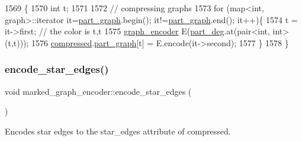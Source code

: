 \begin{DoxyCode}
1569 \{
1570   \textcolor{keywordtype}{int} t;
1571 
1572   \textcolor{comment}{// compressing graphs}
1573   \textcolor{keywordflow}{for} (map<int, graph>::iterator it=\hyperlink{classmarked__graph__encoder_adbafd0769ae301acc1b2c19b5e1d4844}{part\_graph}.begin(); it!=\hyperlink{classmarked__graph__encoder_adbafd0769ae301acc1b2c19b5e1d4844}{part\_graph}.end(); it++)\{
1574     t = it->first; \textcolor{comment}{// the color is t,t}
1575     \hyperlink{classgraph__encoder}{graph\_encoder} E(\hyperlink{classmarked__graph__encoder_a55ea2edb2609dfc287432f61900d6ad1}{part\_deg}.at(pair<int, int>(t,t)));
1576     \hyperlink{classmarked__graph__encoder_ac2ded200860fdd2321f86dd76b28bcb3}{compressed}.\hyperlink{classmarked__graph__compressed_ae179a4737e6eab905c18a94d44ef64b7}{part\_graph}[t] = E.encode(it->second);
1577   \}
1578 \}
\end{DoxyCode}
\mbox{\label{classmarked__graph__encoder_ad6883669a47d24e3d9898978f3252727}} 
\subsubsection{\texorpdfstring{encode\+\_\+star\+\_\+edges()}{encode\_star\_edges()}}
{\footnotesize\ttfamily void marked\+\_\+graph\+\_\+encoder\+::encode\+\_\+star\+\_\+edges (\begin{DoxyParamCaption}{ }\end{DoxyParamCaption})\hspace{0.3cm}{\ttfamily [private]}}



Encodes star edges to the star\+\_\+edges attribute of compressed. 


